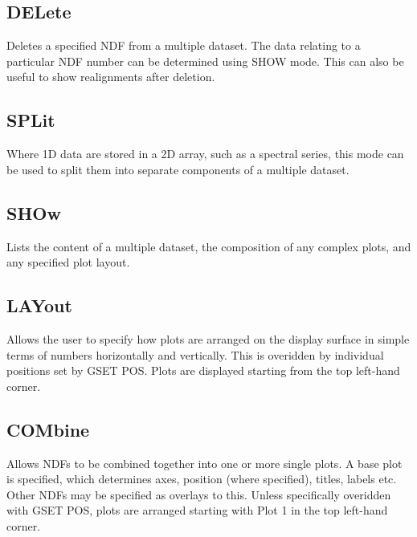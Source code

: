 \documentclass{book}
\renewcommand{\_}{{\tt\char'137}}     %
\begin{document}
\subsection{DELete}
Deletes a specified NDF from a multiple dataset. The data relating
to a particular NDF number can be determined using SHOW mode. This
can also be useful to show realignments after deletion.
 
\subsection{SPLit}
Where 1D data are stored in a 2D array, such as a spectral series,
this mode can be used to split them into separate components of a
multiple dataset.
 
\subsection{SHOw}
Lists the content of a multiple dataset, the composition of any
complex plots, and any specified plot layout.
 
\subsection{LAYout}
Allows the user to specify how plots are arranged on the display
surface in simple terms of numbers horizontally and vertically.
This is overidden by individual positions set by GSET POS. Plots
are displayed starting from the top left-hand corner.
 
\subsection{COMbine}
Allows NDFs to be combined together into one or more single plots.
A base plot is specified, which determines axes, position (where
specified), titles, labels etc. Other NDFs may be specified as
overlays to this. Unless specifically overidden with GSET POS,
plots are arranged starting with Plot 1 in the top left-hand
corner.
 
\end{document}
